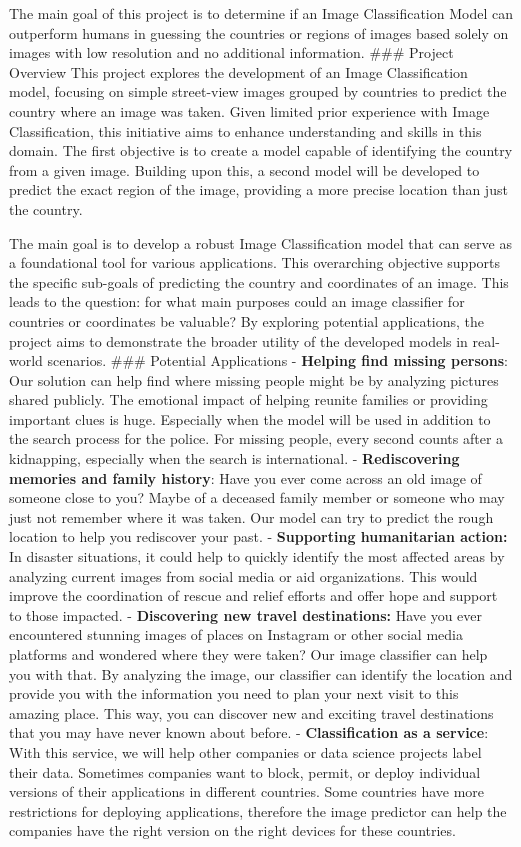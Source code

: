 \documentclass{article}
\begin{document}
The main goal of this project is to determine if an Image Classification
Model can outperform humans in guessing the countries or regions of
images based solely on images with low resolution and no additional
information. \#\#\# Project Overview This project explores the
development of an Image Classification model, focusing on simple
street-view images grouped by countries to predict the country where an
image was taken. Given limited prior experience with Image
Classification, this initiative aims to enhance understanding and skills
in this domain. The first objective is to create a model capable of
identifying the country from a given image. Building upon this, a second
model will be developed to predict the exact region of the image,
providing a more precise location than just the country.

The main goal is to develop a robust Image Classification model that can
serve as a foundational tool for various applications. This overarching
objective supports the specific sub-goals of predicting the country and
coordinates of an image. This leads to the question: for what main
purposes could an image classifier for countries or coordinates be
valuable? By exploring potential applications, the project aims to
demonstrate the broader utility of the developed models in real-world
scenarios. \#\#\# Potential Applications - \textbf{Helping find missing
persons}: Our solution can help find where missing people might be by
analyzing pictures shared publicly. The emotional impact of helping
reunite families or providing important clues is huge. Especially when
the model will be used in addition to the search process for the police.
For missing people, every second counts after a kidnapping, especially
when the search is international. - \textbf{Rediscovering memories and
family history}: Have you ever come across an old image of someone close
to you? Maybe of a deceased family member or someone who may just not
remember where it was taken. Our model can try to predict the rough
location to help you rediscover your past. - \textbf{Supporting
humanitarian action:} In disaster situations, it could help to quickly
identify the most affected areas by analyzing current images from social
media or aid organizations. This would improve the coordination of
rescue and relief efforts and offer hope and support to those impacted.
- \textbf{Discovering new travel destinations:} Have you ever
encountered stunning images of places on Instagram or other social media
platforms and wondered where they were taken? Our image classifier can
help you with that. By analyzing the image, our classifier can identify
the location and provide you with the information you need to plan your
next visit to this amazing place. This way, you can discover new and
exciting travel destinations that you may have never known about before.
- \textbf{Classification as a service}: With this service, we will help
other companies or data science projects label their data. Sometimes
companies want to block, permit, or deploy individual versions of their
applications in different countries. Some countries have more
restrictions for deploying applications, therefore the image predictor
can help the companies have the right version on the right devices for
these countries.
\end{document}
